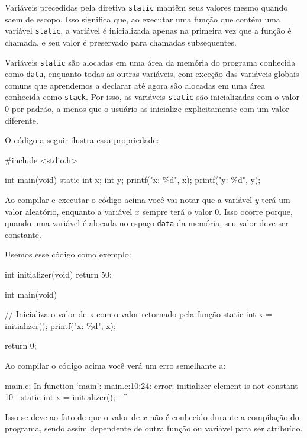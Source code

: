 Variáveis precedidas pela diretiva \texttt{static} mantêm seus valores mesmo 
quando saem de escopo. Isso significa que, ao executar uma função que contém 
uma variável \texttt{static}, a variável é inicializada apenas na primeira vez 
que a função é chamada, e seu valor é preservado para chamadas subsequentes.

Variáveis \texttt{static} são alocadas em uma área da memória do programa 
conhecida como \texttt{data}, enquanto todas as outras variáveis, com exceção 
das variáveis globais comuns que aprendemos a declarar até agora são alocadas 
em uma área conhecida como \texttt{stack}. Por isso, as variáveis \texttt{static} 
são inicializadas com o valor \(0\) por padrão, a menos que o usuário as inicialize 
explicitamente com um valor diferente.

O código a seguir ilustra essa propriedade:

\begin{excode}
    #include <stdio.h>

    int main(void)
    {
        static int x;
        int y;
        printf("x: \%d\n", x);
        printf("y: \%d\n", y);
    }
\end{excode}

Ao compilar e executar o código acima você vai notar que a variável \(y\) 
terá um valor aleatório, enquanto a variável \(x\) sempre terá o valor 0. 
Isso ocorre porque, quando uma variável é alocada no espaço \texttt{data} da 
memória, seu valor deve ser constante.

Usemos esse código como exemplo:

\begin{excode}
    int initializer(void)
    {
        return 50;
    }

    int main(void)
    {
        // Inicializa o valor de x com o valor retornado pela função
        static int x = initializer(); 
        printf("x: \%d\n", x);

        return 0;
    }
\end{excode}

Ao compilar o código acima você verá um erro semelhante a:

\begin{textbox}
    main.c: In function ‘main’:
    main.c:10:24: error: initializer element is not constant
    10 |         static int x = initializer();
    |                        ^~~~~~~~~~~
\end{textbox}

Isso se deve ao fato de que o valor de \(x\) não é conhecido durante a 
compilação do programa, sendo assim dependente de outra função ou variável 
para ser atribuído.

